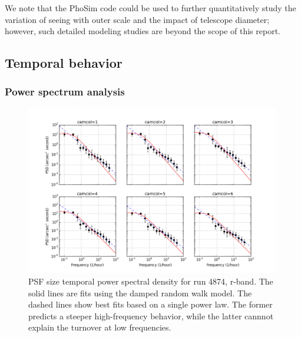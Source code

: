 We note that the PhoSim code could be used to further quantitatively study the variation
of seeing with outer scale and the impact of telescope diameter; however,
such detailed modeling studies are beyond the scope of this report. 


\subsection{Temporal behavior}

\subsubsection{Power spectrum analysis} 

\begin{figure}[th]
\centering
\includegraphics[width=0.99\textwidth]{FIGURES/temporalPSD.png}
\vskip -0.2in
\caption{PSF size temporal power spectral density for run 4874, r-band. 
The solid lines are fits using the damped random walk model. 
The dashed lines show best fits based on a single power law. The former
predicts a steeper high-frequency behavior, while the latter cannnot 
explain the turnover at low frequencies. 
\label{fig:psd}}
\end{figure}


